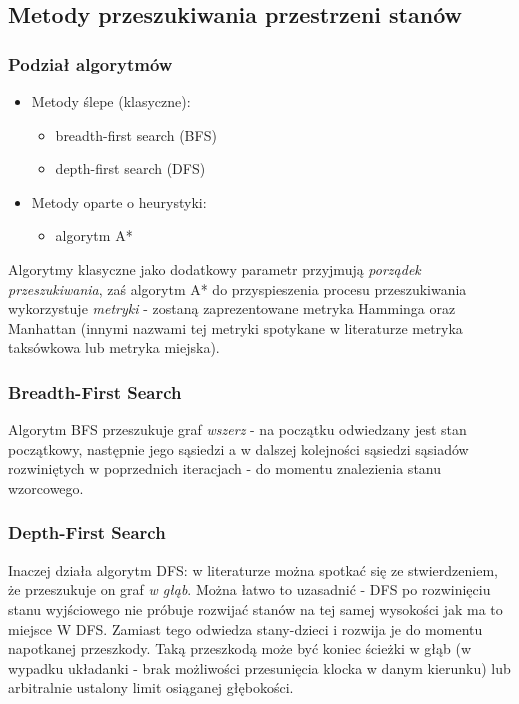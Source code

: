 \documentclass{classrep}
\begin{document}
\subsection{Metody przeszukiwania przestrzeni stanów}
\subsubsection{Podział algorytmów}
\begin{itemize}
  \item Metody ślepe (klasyczne):
    \begin{itemize}
      \item breadth-first search (BFS)
      \item depth-first search (DFS)
    \end{itemize}
  \item Metody oparte o heurystyki:
    \begin{itemize}
      \item algorytm A*
    \end{itemize}
\end{itemize}

Algorytmy klasyczne jako dodatkowy parametr przyjmują \emph{porządek
przeszukiwania}, zaś algorytm A* do przyspieszenia procesu
przeszukiwania wykorzystuje \emph{metryki} - zostaną zaprezentowane
metryka Hamminga oraz Manhattan (innymi nazwami tej metryki spotykane
w literaturze metryka taksówkowa lub metryka miejska).

\subsubsection{Breadth-First Search}

Algorytm BFS przeszukuje graf \emph{wszerz} - na początku
odwiedzany jest stan początkowy, następnie jego sąsiedzi
a w dalszej kolejności sąsiedzi sąsiadów rozwiniętych w poprzednich
iteracjach - do momentu znalezienia stanu wzorcowego.

\subsubsection{Depth-First Search}
Inaczej działa algorytm DFS: w literaturze można spotkać się ze
stwierdzeniem, że przeszukuje on graf \emph{w głąb}. Można łatwo to
uzasadnić - DFS po rozwinięciu stanu wyjściowego nie próbuje rozwijać stanów
na tej samej wysokości jak ma to miejsce W DFS. Zamiast tego odwiedza
stany-dzieci i rozwija je do momentu napotkanej przeszkody. Taką przeszkodą może
być koniec ścieżki w głąb (w wypadku układanki - brak możliwości przesunięcia
klocka w danym kierunku) lub arbitralnie ustalony limit osiąganej głębokości.
\end{document}
